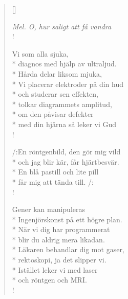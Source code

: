 

\settowidth{\versewidth}{Vi som botar alla sjuka}



\begin{verse}[\versewidth]

\flagverse{}
\emph{Mel. O, hur saligt att få vandra}\\!



Vi som alla sjuka,\\*
diagnos med hjälp av ultraljud.\\*
Hårda delar liksom mjuka,\\*
Vi placerar elektroder på din hud\\*
och studerar sen effekten,\\*
tolkar diagrammets amplitud,\\*
om den påvisar defekter\\*
med din hjärna så leker vi Gud\\!


/:En röntgenbild, den gör mig vild\\*
och jag blir kär, får hjärtbesvär.\\*
En blå pastill och lite pill\\*
får mig att tända till. /:\\!

Gener kan manipuleras\\*
Ingenjörskonst på ett högre plan.\\*
När vi dig har programmerat\\*
blir du aldrig mera likadan.\\*
Läkaren behandlar dig mot gaser,\\*
rektoskopi, ja det slipper vi.\\*
Istället leker vi med laser\\*
och röntgen och MRI.\\!


\end{verse}
